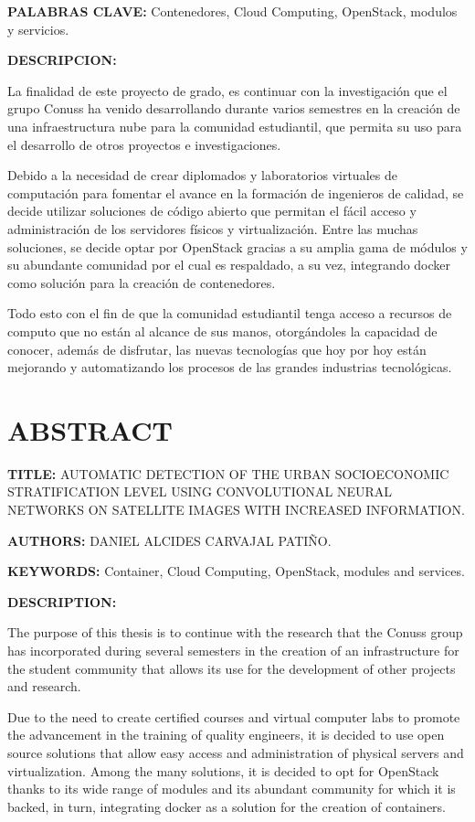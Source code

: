     \textbf{PALABRAS CLAVE:} Contenedores, Cloud Computing, OpenStack, modulos y servicios.	
    
    \textbf{DESCRIPCION:} 
    
    La finalidad de este proyecto de grado, es continuar con la investigación  que el grupo Conuss ha venido desarrollando durante varios semestres en la creación de una infraestructura nube para la comunidad estudiantil, que permita su uso para el desarrollo de otros proyectos e investigaciones.
    
    Debido a la necesidad de crear diplomados y laboratorios virtuales de computación para fomentar el avance en la formación de ingenieros de calidad, se decide utilizar soluciones de código abierto que permitan el fácil acceso y administración de los servidores físicos y virtualización. Entre las muchas soluciones, se decide optar por OpenStack gracias a su amplia gama de módulos y su abundante comunidad por el cual es respaldado, a su vez, integrando docker como solución para la creación de contenedores.
    
    Todo esto con el fin de que la comunidad estudiantil tenga acceso a recursos de computo que no están al alcance de sus manos, otorgándoles la capacidad de conocer, además de disfrutar, las nuevas tecnologías que hoy por hoy están mejorando y automatizando los procesos de las grandes industrias tecnológicas.
    
  
	\newpage\chapter*{ABSTRACT}
    \textbf{TITLE:} AUTOMATIC DETECTION OF THE URBAN SOCIOECONOMIC STRATIFICATION LEVEL USING CONVOLUTIONAL NEURAL NETWORKS ON SATELLITE IMAGES WITH INCREASED INFORMATION.
    
    \textbf{AUTHORS:} DANIEL ALCIDES CARVAJAL PATIÑO.
    
    \textbf{KEYWORDS:} Container, Cloud Computing, OpenStack, modules and services.
    
    \textbf{DESCRIPTION:} 
    
    The purpose of this thesis is to continue with the research that the Conuss group has incorporated during several semesters in the creation of an infrastructure for the student community that allows its use for the development of other projects and research.
    
    Due to the need to create certified courses and virtual computer labs to promote the advancement in the training of quality engineers, it is decided to use open source solutions that allow easy access and administration of physical servers and virtualization. Among the many solutions, it is decided to opt for OpenStack thanks to its wide range of modules and its abundant community for which it is backed, in turn, integrating docker as a solution for the creation of containers.
    
